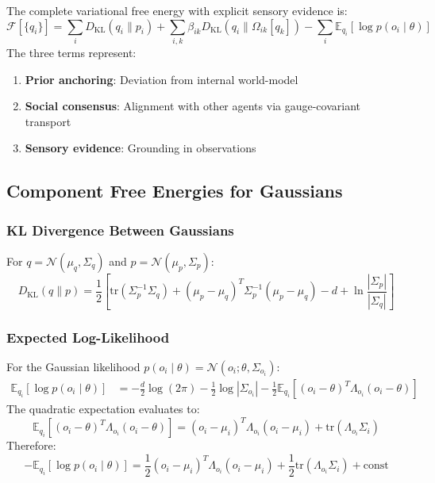 \documentclass[12pt]{article}
\begin{document}
The complete variational free energy with explicit sensory evidence is:
%
\begin{equation}
\boxed{
\mathcal{F}[\{q_i\}] = \sum_i D_{\mathrm{KL}}(q_i \| p_i) + \sum_{i,k} \beta_{ik} D_{\mathrm{KL}}(q_i \| \Omega_{ik}[q_k]) - \sum_i \mathbb{E}_{q_i}[\log p(o_i \mid \theta)]
}
\label{eq:full_free_energy}
\end{equation}
%
The three terms represent:
\begin{enumerate}
    \item \textbf{Prior anchoring}: Deviation from internal world-model
    \item \textbf{Social consensus}: Alignment with other agents via gauge-covariant transport
    \item \textbf{Sensory evidence}: Grounding in observations
\end{enumerate}

\subsection{Component Free Energies for Gaussians}

\subsubsection{KL Divergence Between Gaussians}

For $q = \mathcal{N}(\mu_q, \Sigma_q)$ and $p = \mathcal{N}(\mu_p, \Sigma_p)$:
%
\begin{equation}
D_{\mathrm{KL}}(q \| p) = \frac{1}{2}\left[\mathrm{tr}(\Sigma_p^{-1}\Sigma_q) + (\mu_p - \mu_q)^T\Sigma_p^{-1}(\mu_p - \mu_q) - d + \ln\frac{|\Sigma_p|}{|\Sigma_q|}\right]
\label{eq:kl_gaussian}
\end{equation}

\subsubsection{Expected Log-Likelihood}

For the Gaussian likelihood $p(o_i \mid \theta) = \mathcal{N}(o_i; \theta, \Sigma_{o_i})$:
%
\begin{align}
\mathbb{E}_{q_i}[\log p(o_i \mid \theta)] &= -\frac{d}{2}\log(2\pi) - \frac{1}{2}\log|\Sigma_{o_i}| - \frac{1}{2}\mathbb{E}_{q_i}\left[(o_i - \theta)^T\Lambda_{o_i}(o_i - \theta)\right]
\end{align}
%
The quadratic expectation evaluates to:
%
\begin{equation}
\mathbb{E}_{q_i}\left[(o_i - \theta)^T\Lambda_{o_i}(o_i - \theta)\right] = (o_i - \mu_i)^T\Lambda_{o_i}(o_i - \mu_i) + \mathrm{tr}(\Lambda_{o_i}\Sigma_i)
\end{equation}
%
Therefore:
%
\begin{equation}
\boxed{
-\mathbb{E}_{q_i}[\log p(o_i \mid \theta)] = \frac{1}{2}(o_i - \mu_i)^T\Lambda_{o_i}(o_i - \mu_i) + \frac{1}{2}\mathrm{tr}(\Lambda_{o_i}\Sigma_i) + \mathrm{const}
}
\label{eq:neg_log_likelihood}
\end{equation}
\end{document}
